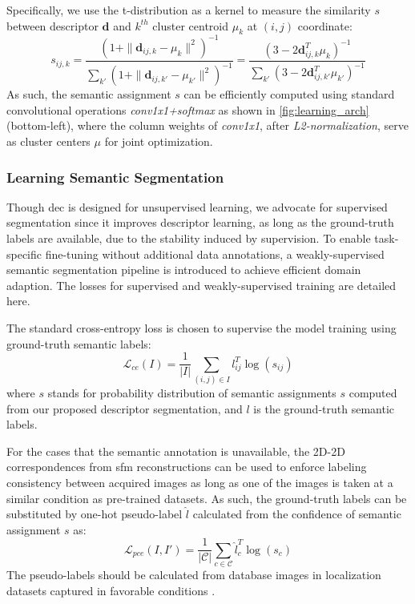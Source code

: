 Specifically, we use the t-distribution as a kernel to measure the similarity $s$ between descriptor $\mathbf{d}$ and $k^{th}$ cluster centroid $\mu_k$ at $(i,j)$ coordinate:
\begin{equation} \label{eq:learning_tdistribution}
s_{ij,k} = \frac{(1+\| \mathbf{d}_{ij,k}-\mu_k \|^2)^{-1}}{\sum_{k'} (1+\| \mathbf{d}_{ij,k'}-\mu_{k'} \|^2)^{-1}} =
\frac{(3 - 2\mathbf{d}_{ij,k}^T\mu_k)^{-1}}{\sum_{k'} (3 - 2\mathbf{d}_{ij,k'}^T\mu_{k'})^{-1}}
\end{equation}
As such, the semantic assignment $s$ can be efficiently computed using standard convolutional operations \textit{conv1x1+softmax} as shown in \ref{fig:learning_arch} (bottom-left), where the column weights of \textit{conv1x1}, after \textit{L2-normalization}, serve as cluster centers $\mu$ for joint optimization.

\subsubsection{Learning Semantic Segmentation}
Though \acrshort{dec} is designed for unsupervised learning, we advocate for supervised segmentation since it improves descriptor learning, as long as the ground-truth labels are available, due to the stability
induced by supervision. 
To enable task-specific fine-tuning without additional data annotations, a weakly-supervised semantic segmentation pipeline is introduced to achieve efficient domain adaption.  
The losses for supervised and weakly-supervised training are detailed here.

The standard cross-entropy loss is chosen to supervise the model training using ground-truth semantic labels:
\begin{equation} \label{eq:learning_crossEntropy}
\mathcal{L}_{ce}(I) = \frac{1}{|I|} \sum_{(i,j) \in I} l_{ij}^T \log (s_{ij})
\end{equation}
where $s$ stands for probability distribution of semantic assignments $s$ computed from our proposed descriptor segmentation, and $l$ is the
ground-truth semantic labels. 

For the cases that the semantic annotation is unavailable, the 2D-2D correspondences from \acrshort{sfm} reconstructions can be used to enforce labeling consistency between acquired images as long as one of the images is taken at a similar condition as pre-trained datasets. 
As such, the ground-truth labels can be substituted by one-hot pseudo-label $\hat{l}$ calculated from the confidence of semantic assignment $s$ as:
\begin{equation} \label{eq:learning_pCrossEntropy}
\mathcal{L}_{pce}(I,I') = \frac{1}{|\mathcal{C}|} \sum_{c \in \mathcal{C}} \hat{l}_c^T \log (s_c)
\end{equation}
The pseudo-labels should be calculated from database images in localization datasets captured in favorable conditions \cite{larsson2019cross}. 


